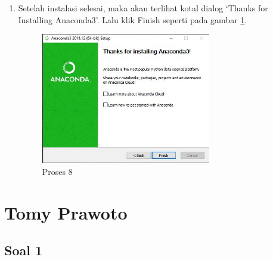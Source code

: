 \begin{itemize}
\begin{enumerate}
\item Setelah instalasi selesai, maka akan terlihat kotal dialog `Thanks for Installing Anaconda3'. Lalu klik Finish seperti pada gambar \ref{gambar8}.
\begin{figure}[ht]
	\centerline{\includegraphics[width=0.70\textwidth]{figures/1/1144124/h.JPG}}
	\caption{Proses 8}
	\label{gambar8}
\end{figure}
	    \end{enumerate}
\end{itemize}

\section{Tomy Prawoto}
\subsection{Soal 1}
